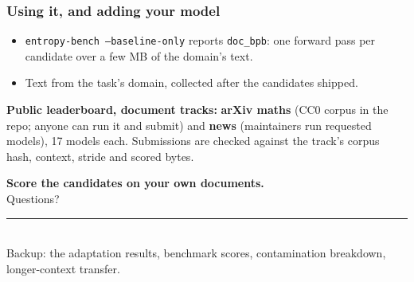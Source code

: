 \documentclass[aspectratio=169,11pt]{beamer}
\newcommand{\keyw}[1]{\textcolor{accent}{\textbf{#1}}}
\begin{document}
\begin{frame}
  \frametitle{Using it, and adding your model}

  \vspace{0.5em}
  \begin{itemize}\setlength\itemsep{0.55em}
    \item \texttt{entropy-bench --baseline-only} reports \texttt{doc\_bpb}: one forward pass per
      candidate over a few MB of the domain's text.
    \item Text from the task's domain, collected after the candidates shipped.
  \end{itemize}

  \vspace{0.4em}
  \small
  \textbf{Public leaderboard, document tracks:} \keyw{arXiv maths} (CC0 corpus in the repo; anyone
  can run it and submit) and \keyw{news} (maintainers run requested models), 17 models each.
  Submissions are checked against the track's corpus hash, context, stride and scored bytes.
\end{frame}

{
\begin{frame}[plain]
  \vspace{2.0em}
  \begin{center}
  {\Large\bfseries Score the candidates on your own documents.}\\[1.2em]
  {\large\color{mute} Questions?}\\[2.0em]
  {\color{rule}\rule{0.5\textwidth}{0.6pt}}\\[1.0em]
  {\small\color{mute} Backup: the adaptation results, benchmark scores, contamination breakdown,
  longer-context transfer.}
  \end{center}
\end{frame}
}
\end{document}
